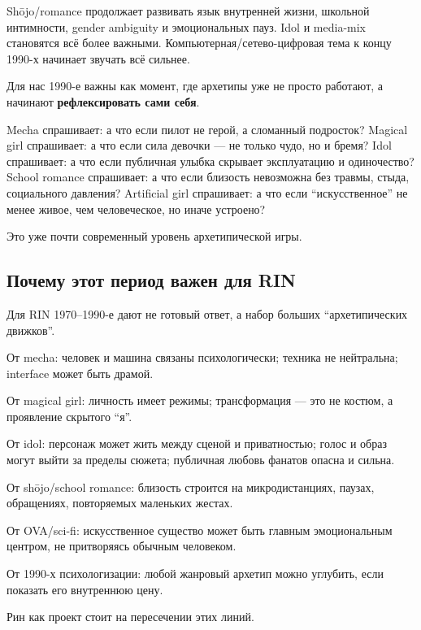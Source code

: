 Shōjo/\hspace{0pt}romance продолжает развивать язык внутренней жизни, школьной
интимности, gender ambiguity и эмоциональных пауз. Idol и media-mix
становятся всё более важными. Компьютерная/\hspace{0pt}сетево-цифровая тема к концу
1990-х начинает звучать всё сильнее.

Для нас 1990-е важны как момент, где архетипы уже не просто работают, а
начинают \textbf{рефлексировать сами себя}.

Mecha спрашивает: а что если пилот не герой, а сломанный подросток?
Magical girl спрашивает: а что если сила девочки --- не только чудо, но
и бремя? Idol спрашивает: а что если публичная улыбка скрывает
эксплуатацию и одиночество? School romance спрашивает: а что если
близость невозможна без травмы, стыда, социального давления? Artificial
girl спрашивает: а что если ``искусственное'' не менее живое, чем
человеческое, но иначе устроено?

Это уже почти современный уровень архетипической игры.

\subsection*{Почему этот период важен для RIN}

Для RIN 1970--1990-е дают не готовый ответ, а набор больших
``архетипических движков''.

От mecha: человек и машина связаны психологически; техника не
нейтральна; interface может быть драмой.

От magical girl: личность имеет режимы; трансформация --- это не костюм,
а проявление скрытого ``я''.

От idol: персонаж может жить между сценой и приватностью; голос и образ
могут выйти за пределы сюжета; публичная любовь фанатов опасна и сильна.

От shōjo/\hspace{0pt}school romance: близость строится на микродистанциях, паузах,
обращениях, повторяемых маленьких жестах.

От OVA/\hspace{0pt}sci-fi: искусственное существо может быть главным эмоциональным
центром, не притворяясь обычным человеком.

От 1990-х психологизации: любой жанровый архетип можно углубить, если
показать его внутреннюю цену.

Рин как проект стоит на пересечении этих линий.

